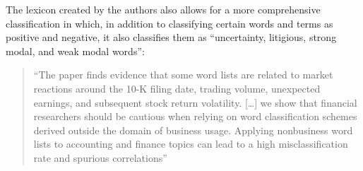 The lexicon created by the authors also allows for a more comprehensive classification in which, in addition to classifying certain words and terms as positive and negative, it also classifies them as ``uncertainty, litigious, strong modal, and weak modal words''\citep[p.62]{loughran2011liability}: 
\begin{quote}
    ``The paper finds evidence that some word lists are related to market reactions around the 10-K filing date, trading volume, unexpected earnings, and subsequent stock return volatility. [\dots] we show that financial researchers should be cautious when relying on word classification schemes derived outside the domain of business usage. Applying nonbusiness word lists to accounting and finance topics can lead to a high misclassification rate and spurious correlations''\citep[p.62]{loughran2011liability}
\end{quote}







